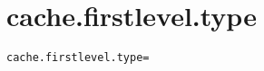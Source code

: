 \section{cache.firstlevel.type}
\label{configuration:CacheFirstlevelType}
\AvailableInJavaAndCsharp{\TODO}
\begin{lstlisting}[style=Props,caption={Usage example for \textit{cache.firstlevel.type}}]
cache.firstlevel.type=
\end{lstlisting}